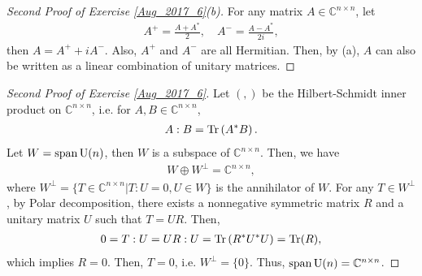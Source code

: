 \documentclass[11pt]{article}
\theoremstyle{definition}
\numberwithin{equation}{subsection}
\begin{document}
\begin{proof}[Second Proof of Exercise \ref{Aug_2017_6}(b)]
For any matrix $A \in \mathbb{C}^{n \times n}$, let 
\begin{align*}
    A^+ = \frac{A + A^*}{2}, \quad A^{-} = \frac{A - A^*}{2i},
\end{align*}
then $A = A^+ + i A^{-}$. Also, $A^+$ and $A^{-}$ are all Hermitian. Then, by (a), $A$ can also be written as a linear combination of unitary matrices.
\end{proof}

\medskip

\begin{proof}[Second Proof of Exercise \ref{Aug_2017_6}]
Let $(,)$ be the Hilbert-Schmidt inner product on $\mathbb{C}^{n \times n}$, i.e. for $A, B \in \mathbb{C}^{n \times n}$, 
\begin{align*}
    A:B = \Tr\left(A^*B\right).
\end{align*}
Let $W = \operatorname{span} {\rm U}(n)$, then $W$ is a subspace of $\mathbb{C}^{n \times n}$. Then, we have
\begin{align*}
    W \oplus W^{\bot} = \mathbb{C}^{n \times n},
\end{align*}
where $W^{\bot} = \{T \in \mathbb{C}^{n \times n} | T:U = 0, U \in W\}$ is the annihilator of $W$. For any $T \in W^{\bot}$, by Polar decomposition, there exists a nonnegative symmetric matrix $R$ and a unitary matrix $U$ such that $T = UR$\cite{9}. Then,
\begin{align*}
    0 = T:U = UR:U = \Tr\left(R^*U^*U\right) = \Tr(R),
\end{align*}
which implies $R = 0$. Then, $T = 0$, i.e. $W^\bot = \{0\}$. Thus, $\operatorname{span} {\rm U}(n) = \mathbb{C}^{n \times n}$.
\end{proof}


















\newpage


\end{document}
